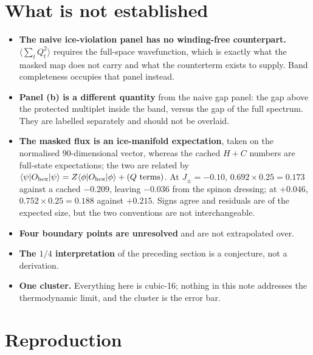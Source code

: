 \documentclass[11pt]{article}
\newcommand{\Jpm}{J_{\pm}}
\newcommand{\Ohex}{O_{\rm hex}}
\begin{document}
\section{What is not established}

\begin{itemize}\itemsep2pt
\item \textbf{The naive ice-violation panel has no winding-free
counterpart.}  $\langle\sum_t Q_t^2\rangle$ requires the full-space
wavefunction, which is exactly what the masked map does not carry and what
the counterterm exists to supply.  Band completeness occupies that panel
instead.
\item \textbf{Panel (b) is a different quantity} from the naive gap panel:
the gap above the protected multiplet inside the band, versus the gap of
the full spectrum.  They are labelled separately and should not be
overlaid.
\item \textbf{The masked flux is an ice-manifold expectation}, taken on the
normalised $90$-dimensional vector, whereas the cached $H+C$ numbers are
full-state expectations; the two are related by
$\langle\psi|\Ohex|\psi\rangle = Z\langle\phi|\Ohex|\phi\rangle +
(\text{$Q$ terms})$.  At $\Jpm=-0.10$, $0.692\times0.25=0.173$ against a
cached $-0.209$, leaving $-0.036$ from the spinon dressing; at $+0.046$,
$0.752\times0.25=0.188$ against $+0.215$.  Signs agree and residuals are of
the expected size, but the two conventions are not interchangeable.
\item \textbf{Four boundary points are unresolved} and are not
extrapolated over.
\item \textbf{The $1/4$ interpretation} of the preceding section is a
conjecture, not a derivation.
\item \textbf{One cluster.}  Everything here is cubic-16; nothing in this
note addresses the thermodynamic limit, and the cluster is the error bar.
\end{itemize}

\section{Reproduction}
\end{document}
